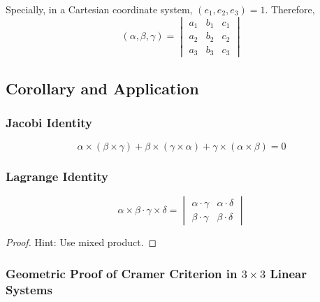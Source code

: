 \documentclass[onecolumn]{ctexart}
\begin{document}
Specially, in a Cartesian coordinate system, $(e_1, e_2, e_3) = 1$. Therefore,
\begin{equation}
  (\alpha, \beta, \gamma) = 
  \begin{vmatrix}
    a_1 & b_1 & c_1 \\
    a_2 & b_2 & c_2 \\
    a_3 & b_3 & c_3
  \end{vmatrix}
\end{equation}

\subsection{Corollary and Application}

\subsubsection{Jacobi Identity}

\begin{equation}
  \alpha \times (\beta \times \gamma) + \beta \times (\gamma \times \alpha) + \gamma \times (\alpha \times \beta) = 0
\end{equation}

\subsubsection{Lagrange Identity}
\begin{equation}
  \alpha \times \beta \cdot \gamma \times \delta = 
  \begin{vmatrix}
    \alpha \cdot \gamma & \alpha \cdot \delta \\
    \beta \cdot \gamma & \beta \cdot \delta
  \end{vmatrix}
\end{equation}
\begin{proof}
  Hint: Use mixed product.
\end{proof}

\subsubsection{Geometric Proof of Cramer Criterion in $3 \times 3$ Linear Systems}
\end{document}
